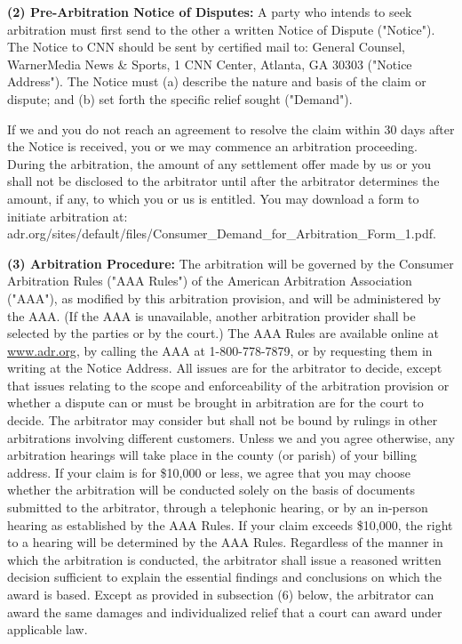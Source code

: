 \textbf{(2) Pre-Arbitration Notice of Disputes:} A party who intends to
seek arbitration must first send to the other a written Notice of
Dispute ("Notice"). The Notice to CNN should be sent by certified mail
to: General Counsel, WarnerMedia News \& Sports, 1 CNN Center, Atlanta,
GA 30303 ("Notice Address"). The Notice must (a) describe the nature and
basis of the claim or dispute; and (b) set forth the specific relief
sought ("Demand").

If we and you do not reach an agreement to resolve the claim within 30
days after the Notice is received, you or we may commence an arbitration
proceeding. During the arbitration, the amount of any settlement offer
made by us or you shall not be disclosed to the arbitrator until after
the arbitrator determines the amount, if any, to which you or us is
entitled. You may download a form to initiate arbitration at:
adr.org/sites/default/files/Consumer\_Demand\_for\_Arbitration\_Form\_1.pdf.

\textbf{(3) Arbitration Procedure:} The arbitration will be governed by
the Consumer Arbitration Rules ("AAA Rules") of the American Arbitration
Association ("AAA"), as modified by this arbitration provision, and will
be administered by the AAA. (If the AAA is unavailable, another
arbitration provider shall be selected by the parties or by the court.)
The AAA Rules are available online at
\href{http://www.adr.org}{www.adr.org}, by calling the AAA at
1-800-778-7879, or by requesting them in writing at the Notice Address.
All issues are for the arbitrator to decide, except that issues relating
to the scope and enforceability of the arbitration provision or whether
a dispute can or must be brought in arbitration are for the court to
decide. The arbitrator may consider but shall not be bound by rulings in
other arbitrations involving different customers. Unless we and you
agree otherwise, any arbitration hearings will take place in the county
(or parish) of your billing address. If your claim is for \$10,000 or
less, we agree that you may choose whether the arbitration will be
conducted solely on the basis of documents submitted to the arbitrator,
through a telephonic hearing, or by an in-person hearing as established
by the AAA Rules. If your claim exceeds \$10,000, the right to a hearing
will be determined by the AAA Rules. Regardless of the manner in which
the arbitration is conducted, the arbitrator shall issue a reasoned
written decision sufficient to explain the essential findings and
conclusions on which the award is based. Except as provided in
subsection (6) below, the arbitrator can award the same damages and
individualized relief that a court can award under applicable law.

